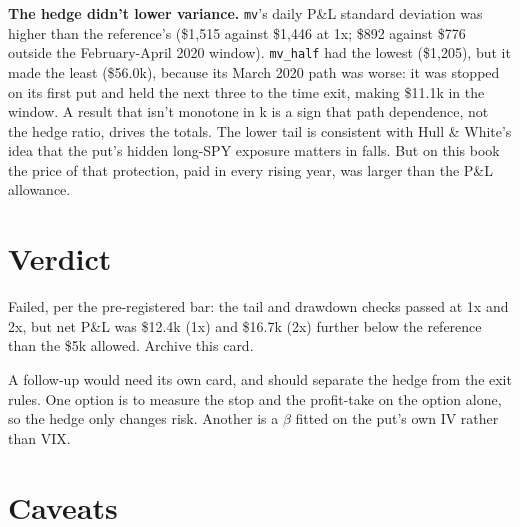 \documentclass{article}
\begin{document}
\textbf{The hedge didn't lower variance.} \texttt{mv}'s daily P\&L standard deviation was higher than the reference's (\$1,515 against \$1,446 at 1x; \$892 against \$776 outside the February-April 2020 window). \texttt{mv\_\allowbreak{}half} had the lowest (\$1,205), but it made the least (\$56.0k), because its March 2020 path was worse: it was stopped on its first put and held the next three to the time exit, making \$11.1k in the window. A result that isn't monotone in k is a sign that path dependence, not the hedge ratio, drives the totals. The lower tail is consistent with Hull \& White's idea that the put's hidden long-SPY exposure matters in falls. But on this book the price of that protection, paid in every rising year, was larger than the P\&L allowance.

\section{Verdict}

Failed, per the pre-registered bar: the tail and drawdown checks passed at 1x and 2x, but net P\&L was \$12.4k (1x) and \$16.7k (2x) further below the reference than the \$5k allowed. Archive this card.

A follow-up would need its own card, and should separate the hedge from the exit rules. One option is to measure the stop and the profit-take on the option alone, so the hedge only changes risk. Another is a \ensuremath{\beta} fitted on the put's own IV rather than VIX.

\section{Caveats}
\end{document}
